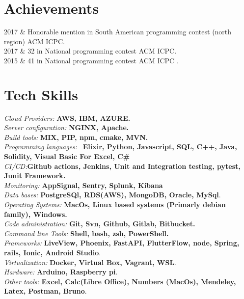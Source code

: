 \documentclass[
    changecolor={111, 156, 45}, 
]{cv-roald}
\begin{document}
\section*{Achievements}
\begin{tabularcv}	
2017    &   Honorable mention in  South American programming contest (north region) ACM ICPC. \\
2017	&	 32 in National programming contest ACM ICPC.  \\
2015    &   41 in National programming contest ACM ICPC  .  \\

                
\end{tabularcv}

\section*{Tech Skills}
    \textit{ Cloud Providers:} \textbf{AWS, IBM, AZURE.}\\
    \textit{Server configuration:} \textbf{NGINX, Apache.}\\
    \textit{Build tools:}  \textbf{MIX, PIP, npm, cmake, MVN.}\\
	\textit{Programming languages:}  \  \textbf{Elixir, Python, Javascript, SQL, C++, Java, Solidity, Visual Basic For Excel, C\#}\\
	\textit{CI/CD:}\textbf{Github actions, Jenkins, Unit and Integration testing, pytest, Junit Framework.}\\
    \textit{Monitoring:} \textbf{AppSignal, Sentry, Splunk, Kibana}\\
	\textit{Data bases:} \textbf{PostgreSQl, RDS(AWS),  MongoDB, Oracle, MySql}.\\
	\textit{Operating Systems:}  \textbf{MacOs, Linux based systems (Primarly debian family), Windows.}\\
	\textit{Code administration: } \textbf{Git, Svn, Github, Gitlab, Bitbucket.}\\
	\textit{Command line Tools:} \textbf{Shell, bash, zsh, PowerShell.}\\
	\textit{Frameworks:} \textbf{LiveView, Phoenix, FastAPI, FlutterFlow, node, Spring, rails, Ionic, Android Studio}. \\
	\textit{Virtualization:} \textbf{Docker, Virtual Box, Vagrant, WSL}.\\
	\textit{Hardware:} \textbf{Arduino, Raspberry pi}.\\
	\textit{Other tools:} \textbf{Excel, Calc(Libre Office), Numbers (MacOs), Mendeley, Latex, Postman, Bruno}.
\end{document}
